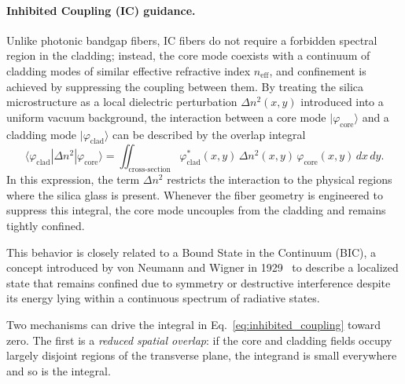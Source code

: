 \paragraph{Inhibited Coupling (IC) guidance.}
Unlike photonic bandgap fibers, IC fibers do not require a forbidden spectral region in the cladding; instead, the core mode coexists with a continuum of cladding modes of similar effective refractive index $n_{\text{eff}}$, and confinement is achieved by suppressing the coupling between them. By treating the silica microstructure as a local dielectric perturbation $\Delta n^2(x,y)$ introduced into a uniform vacuum background, the interaction between a core mode $|\varphi_{\text{core}}\rangle$ and a cladding mode $|\varphi_{\text{clad}}\rangle$ can be described by the overlap integral~\cite{Debord2019}
\begin{equation}
\langle \varphi_{\text{clad}} | \Delta n^2 | \varphi_{\text{core}} \rangle
= \iint_{\text{cross-section}} \varphi_{\text{clad}}^*(x,y)\, \Delta n^2(x,y)\, \varphi_{\text{core}}(x,y)\, dx\, dy.
\label{eq:inhibited_coupling}
\end{equation}
In this expression, the term $\Delta n^2$ restricts the interaction to the physical regions where the silica glass is present. Whenever the fiber geometry is engineered to suppress this integral, the core mode uncouples from the cladding and remains tightly confined.

This behavior is closely related to a Bound State in the Continuum (BIC), a concept introduced by von Neumann and Wigner in 1929~\cite{vonNeumann1929} to describe a localized state that remains confined due to symmetry or destructive interference despite its energy lying within a continuous spectrum of radiative states.

Two mechanisms can drive the integral in Eq.~\ref{eq:inhibited_coupling} toward zero. The first is a \emph{reduced spatial overlap}: if the core and cladding fields occupy largely disjoint regions of the transverse plane, the integrand is small everywhere and so is the integral.

